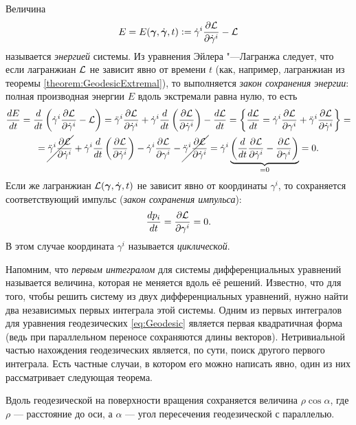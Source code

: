 \noindent
Величина
\[
	E = E(\boldsymbol{\gamma}, \dot{\boldsymbol{\gamma}}, t) \vcentcolon = \dot{\gamma}^i\frac{\partial\mathcal{L}}{\partial\dot{\gamma}^i} - \mathcal{L}
\]
называется \textit{энергией} системы. Из уравнения Эйлера "---Лагранжа следует, что если лагранжиан $\mathcal{L}$ не зависит явно от времени $t$ (как, например, лагранжиан из теоремы \ref{theorem:GeodesicExtremal}), то выполняется \textit{закон сохранения энергии}: полная производная энергии $E$ вдоль экстремали равна нулю, то есть
\begin{multline*}
	\frac{dE}{dt} = \frac{d}{dt}\left(\dot{\gamma}^i\frac{\partial\mathcal{L}}{\partial\dot{\gamma}^i} - \mathcal{L}\right) = \ddot{\gamma}^i\frac{\partial\mathcal{L}}{\partial\dot{\gamma}^i} + \dot{\gamma}^i\frac{d}{dt}\left(\frac{\partial\mathcal{L}}{\partial\dot{\gamma}^i}\right) - \frac{d\mathcal{L}}{dt} = \left\{\frac{d\mathcal{L}}{dt} = \dot{\gamma}^i\frac{\partial\mathcal{L}}{\partial\gamma^i} + \ddot{\gamma}^i\frac{\partial\mathcal{L}}{\partial\dot{\gamma}^i}\right\} =\\ = \cancel{\ddot{\gamma}^i\frac{\partial\mathcal{L}}{\partial\dot{\gamma}^i}} + \dot{\gamma}^i\frac{d}{dt}\left(\frac{\partial\mathcal{L}}{\partial\dot{\gamma}^i}\right) - \dot{\gamma}^i\frac{\partial\mathcal{L}}{\partial\gamma^i} - \cancel{\ddot{\gamma}^i\frac{\partial\mathcal{L}}{\partial\dot{\gamma}^i}} = \dot{\gamma}^i\underbrace{\left(\frac{d}{dt}\frac{\partial\mathcal{L}}{\partial\dot{\gamma}^i} - \frac{\partial\mathcal{L}}{\partial\gamma^i}\right)}_{{} = 0} = 0.
\end{multline*}
Если же лагранжиан $\mathcal{L}(\boldsymbol{\gamma}, \dot{\boldsymbol{\gamma}}, t)$ не зависит явно от координаты $\gamma^i$, то сохраняется соответствующий импульс (\textit{закон сохранения импульса}):
\[
	\frac{dp_i}{dt} = \frac{\partial\mathcal{L}}{\partial\gamma^i} = 0.
\]
В этом случае координата $\gamma^i$ называется \textit{циклической}.

Напомним, что \textit{первым интегралом} для системы дифференциальных уравнений называется величина, которая не меняется вдоль её решений. Известно, что для того, чтобы решить систему из двух дифференциальных уравнений, нужно найти два независимых первых интеграла этой системы. Одним из первых интегралов для уравнения геодезических \eqref{eq:Geodesic} является первая квадратичная форма (ведь при параллельном переносе сохраняются длины векторов). Нетривиальной частью нахождения геодезических является, по сути, поиск другого первого интеграла. Есть частные случаи, в котором его можно написать явно, один из них рассматривает следующая теорема.

\begin{theorem}[Клеро] \label{theorem:Clairaut}
	Вдоль геодезической на поверхности вращения сохраняется величина $\rho\cos\alpha$, где $\rho$ --- расстояние до оси, а $\alpha$ --- угол пересечения геодезической с параллелью.
\end{theorem}


